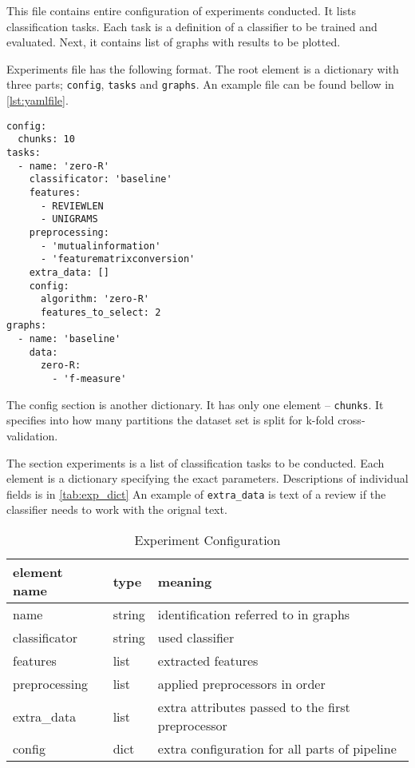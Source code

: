 This file contains entire configuration of experiments conducted.
It lists classification tasks.
Each task is a definition of a classifier to be trained and evaluated.
Next, it contains list of graphs with results to be plotted.

Experiments file has the following format.
The root element is a dictionary with three parts;
\texttt{config}, \texttt{tasks} and \texttt{graphs}.
An example file can be found bellow in \autoref{lst:yamlfile}.

\begin{lstlisting}[label={lst:yamlfile}]
config:
  chunks: 10
tasks:
  - name: 'zero-R'
    classificator: 'baseline'
    features:
      - REVIEWLEN
      - UNIGRAMS
    preprocessing:
      - 'mutualinformation'
      - 'featurematrixconversion'
    extra_data: []
    config:
      algorithm: 'zero-R'
      features_to_select: 2
graphs:
  - name: 'baseline'
    data:
      zero-R:
        - 'f-measure'
\end{lstlisting}

The config section is another dictionary.
It has only one element -- \texttt{chunks}.
It specifies into how many partitions the dataset set is split for k-fold cross-validation.

The section experiments is a list of classification tasks to be conducted.
Each element is a dictionary specifying the exact parameters.
Descriptions of individual fields is in \autoref{tab:exp_dict}
An example of \texttt{extra\_data} is text of a review if the classifier needs to work
with the orignal text.

\begin{table}[h]

\centering
\begin{tabular}{lll}
\toprule
\textbf{element name} & \textbf{type} & \textbf{meaning}\\
\midrule
name 			& string	& identification referred to in graphs\\
classificator 	& string	& used classifier\\
features 		& list		& extracted features \todoA{reference} \\
preprocessing 	& list		& applied preprocessors in order\\
extra\_data 	& list 		& extra attributes passed to the first preprocessor \\
config			& dict		& extra configuration for all parts of pipeline \\
\bottomrule
\end{tabular}

\caption{Experiment Configuration}\label{tab:exp_dict}
\end{table}


